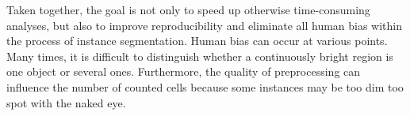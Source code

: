 Taken together, the goal is not only to speed up otherwise time-consuming analyses, but also to improve reproducibility and eliminate all human bias within the process of instance segmentation. Human bias can occur at various points. Many times, it is difficult to distinguish whether a continuously bright region is one object or several ones. Furthermore, the quality of preprocessing can influence the number of counted cells because some instances may be too dim too spot with the naked eye.
